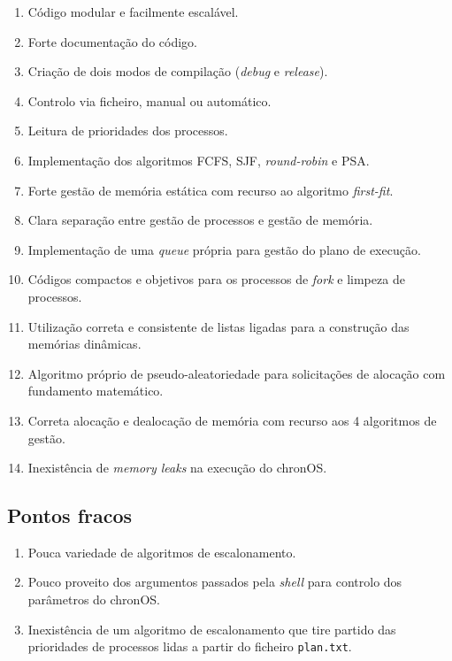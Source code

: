 \documentclass[10pt,oneside]{estiloUBI}
\newcommand{\chronOS}{\textsf{chronOS}}
\begin{document}
	\begin{enumerate}
		\item Código modular e facilmente escalável.
		\item Forte documentação do código.
		\item Criação de dois modos de compilação (\textit{debug} e \textit{release}).
		\item Controlo via ficheiro, manual ou automático.
		\item Leitura de prioridades dos processos.
		\item Implementação dos algoritmos \ac{FCFS}, \ac{SJF}, \textit{round-robin} e \ac{PSA}.
		\item Forte gestão de memória estática com recurso ao algoritmo \textit{first-fit}.
		\item Clara separação entre gestão de processos e gestão de memória.
		\item Implementação de uma \textit{queue} própria para gestão do plano de execução.
		\item Códigos compactos e objetivos para os processos de \textit{fork} e limpeza de processos.
		\item Utilização correta e consistente de listas ligadas para a construção das memórias dinâmicas.
		\item Algoritmo próprio de pseudo-aleatoriedade para solicitações de alocação com fundamento matemático.
		\item Correta alocação e dealocação de memória com recurso aos 4 algoritmos de gestão.
		\item Inexistência de \textit{memory leaks} na execução do \chronOS.
	\end{enumerate}
	
	
	\subsection{Pontos fracos}
	
	\begin{enumerate}
		\item Pouca variedade de algoritmos de escalonamento.
		\item Pouco proveito dos argumentos passados pela \textit{shell} para controlo dos parâmetros do \chronOS.
		\item Inexistência de um algoritmo de escalonamento que tire partido das prioridades de processos lidas a partir do ficheiro \verb|plan.txt|.
	\end{enumerate}
	
\end{document}

